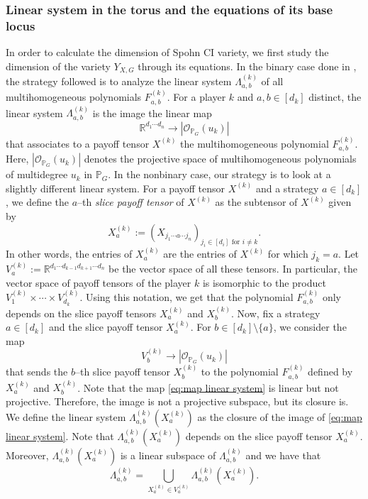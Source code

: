 \documentclass[11pt]{amsart}
\numberwithin{equation}{section}
\theoremstyle{plain}
\numberwithin{theorem}{section}
\theoremstyle{definition}
\newcommand{\PP}{{\mathbb P}}
\begin{document}
\subsubsection{Linear system in the torus and the equations of its base locus}\label{subsec:linsys}
In order to calculate the dimension of Spohn CI variety, we first study the dimension of the variety $Y_{X,G}$ through its equations. In the binary case done in \cite[Section 3]{portakal2024game}, the strategy followed is to analyze the linear system $\Lambda_{a,b}^{(k)}$ of all multihomogeneous polynomials $F_{a,b}^{(k)}$. For a player $k$ and $a,b\in[d_k]$ distinct, the linear system $\Lambda_{a,b}^{(k)}$ is the image the linear map 
\[
\mathbb{R}^{d_1\cdots d_n}\longrightarrow |\mathcal{O}_{\PP_G}(u_k)|
\] 
that associates to a payoff tensor $X^{(k)}$ the multihomogeneous polynomial $F^{(k)}_{a,b}$. Here, $|\mathcal{O}_{\PP_G}(u_k)|$ denotes the projective space of multihomogeneous polynomials of multidegree $u_k$ in $\PP_{G}$. In the nonbinary case, our strategy is to look at a slightly different linear system.
For a payoff tensor $X^{(k)}$ and a strategy $a\in [d_k]$, we define the $a$--th \textit{slice payoff tensor} of $X^{(k)}$ as the subtensor of $X^{(k)}$ given by $$X^{(k)}_{a}:=(X_{j_1\cdots a\cdots j_n})_{j_i\in[d_i]\text{ for } i\neq k}.$$
In other words, the entries of $X^{(k)}_{a}$ are the entries of $X^{(k)}$ for which $j_k=a$. Let $V_a^{(k)}:=\mathbb{R}^{d_1\cdots d_{k-1}d_{k+1}\cdots d_n}$ be the vector space of all these tensors. In particular, the vector space of payoff tensors of the player $k$ is isomorphic to the product $V_1^{(k)}\times \cdots \times V_{d_k}^{(k)}$.  Using this notation, we get that the polynomial $F^{(k)}_{a,b}$ only depends on the slice payoff tensors $X^{(k)}_a$ and $X^{(k)}_b$.
Now, fix a strategy $a\in[d_k]$ and the slice payoff tensor $X^{(k)}_a$. For $b\in[d_k]\setminus\{a\}$, we consider the map 
\begin{equation*}
    \label{eq:map linear system}
V_b^{(k)}\longrightarrow |\mathcal{O}_{\PP_G}(u_k)|
\end{equation*}
that sends the $b$--th slice payoff tensor $X^{(k)}_b$ to the polynomial $F_{a,b}^{(k)}$ defined by $X^{(k)}_a$ and $X^{(k)}_b$.  Note that the map \eqref{eq:map linear system} is linear but not projective. Therefore, the image is not a projective subspace, but its closure is.
We define the linear system $\Lambda_{a,b}^{(k)}(X^{(k)}_a)$ as the closure of the image of \eqref{eq:map linear system}.  Note that $\Lambda_{a,b}^{(k)}(X^{(k)}_a)$ depends on the slice payoff tensor $X^{(k)}_a$. Moreover, $\Lambda_{a,b}^{(k)}(X^{(k)}_a)$ is a linear subspace of $\Lambda_{a,b}^{(k)}$ and we have that
\[
\Lambda_{a,b}^{(k)}=
\bigcup_{X^{(k)}_a\in V_a^{(k)}} \Lambda_{a,b}^{(k)}(X^{(k)}_a).
\]
\end{document}
